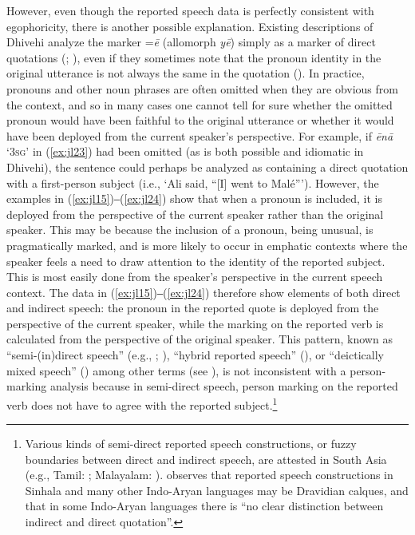 \documentclass[output=paper]{langsci/langscibook}
\begin{document}
\largerpage[-1]
However, even though the reported speech data is perfectly consistent with egophoricity, there is another possible explanation. Existing descriptions of Dhivehi analyze the marker =\textit{ē} (allomorph \textit{yē}) simply as a marker of direct quotations (\citealt[47]{CainGair2000}; \citealt[302]{Gnanadesikan2017}), even if they sometimes note that the pronoun identity in the original utterance is not always the same in the quotation (\citealt[302--303]{Gnanadesikan2017}). In practice, pronouns and other noun phrases are often omitted when they are obvious from the context, and so in many cases one cannot tell for sure whether the omitted pronoun would have been faithful to the original utterance or whether it would have been deployed from the current speaker’s perspective. For example, if \textit{ēnā} ‘3\textsc{sg}’ in (\ref{ex:jl23}) had been omitted (as is both possible and idiomatic in Dhivehi), the sentence could perhaps be analyzed as containing a direct quotation with a first-person subject (i.e., ‘Ali said, “[I] went to Malé”’). However, the examples in (\ref{ex:jl15})‒(\ref{ex:jl24}) show that when a pronoun is included, it is deployed from the perspective of the current speaker rather than the original speaker. This may be because the inclusion of a pronoun, being unusual, is pragmatically marked, and is more likely to occur in emphatic contexts where the speaker feels a need to draw attention to the identity of the reported subject. This is most easily done from the speaker’s perspective in the current speech context. The data in (\ref{ex:jl15})‒(\ref{ex:jl24}) therefore show elements of both direct and indirect speech: the pronoun in the reported quote is deployed from the perspective of the current speaker, while the marking on the reported verb is calculated from the perspective of the original speaker. This pattern, known as “semi-(in)direct speech” (e.g., \citealt{Aikhenvald2008}; \citeyear{Aikhenvald2011}), “hybrid reported speech” (\citealt{TournadreDorje2003}), or “deictically mixed speech” (\citealt{WidmerZemp2017}) among other terms (see \citealt{Evans2012}), is not inconsistent with a person-marking analysis because in semi-direct speech, person marking on the reported verb does not have to agree with the reported subject.\footnote{Various kinds of semi-direct reported speech constructions, or fuzzy boundaries between direct and indirect speech, are attested in South Asia (e.g., Tamil: \citealt[373–375]{Lehmann1989}; Malayalam: \citealt[2–7]{AsherKumari1997}). \cite[403]{Masica1991} observes that reported speech constructions in Sinhala and many other Indo-Aryan languages may be Dravidian calques, and that in some Indo-Aryan languages there is “no clear distinction between indirect and direct quotation”.}
\end{document}
